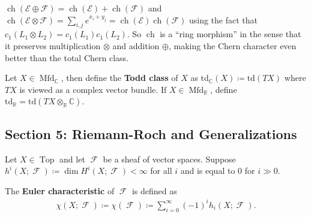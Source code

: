 \begin{remark}

\(\operatorname{ch}(\mathcal{E} \oplus \mathcal{F}) = \operatorname{ch}(\mathcal{E}) + \operatorname{ch}(\mathcal{F})\)
and
\(\operatorname{ch}( \mathcal{E} \otimes\mathcal{F} ) = \sum_{i,j} e^{x_i + y_j} = \operatorname{ch}( \mathcal{E} ) \operatorname{ch}(\mathcal{F} )\)
using the fact that \(c_1(L_1 \otimes L_2) = c_1(L_1) c_1(L_2)\). So
\(\operatorname{ch}\) is a ``ring morphism'' in the sense that it
preserves multiplication \(\otimes\) and addition \(\oplus\), making the
Chern character even better than the total Chern class.

\end{remark}

\begin{definition}

Let \(X \in {\operatorname{Mfd}}_{\mathbb{C}}\), then define the
\textbf{Todd class} of \(X\) as
\(\mathrm{td}_{\mathbb{C}}(X) \coloneqq\mathrm{td}(TX)\) where \(TX\) is
viewed as a complex vector bundle. If
\(X\in {\operatorname{Mfd}}_{\mathbb{R}}\), define
\(\mathrm{td}_{\mathbb{R}}= \mathrm{td}(TX \otimes_{\mathbb{R}}{\mathbb{C}})\).

\end{definition}

\hypertarget{section-5-riemann-roch-and-generalizations}{%
\subsection{Section 5: Riemann-Roch and
Generalizations}\label{section-5-riemann-roch-and-generalizations}}

\begin{remark}

Let \(X\in {\operatorname{Top}}\) and let \(\operatorname{\mathcal{F}}\)
be a sheaf of vector spaces. Suppose
\(h^i(X; \operatorname{\mathcal{F}}) \coloneqq\dim H^i(X; \operatorname{\mathcal{F}}) < \infty\)
for all \(i\) and is equal to 0 for \(i \gg 0\).

\end{remark}

\begin{definition}

The \textbf{Euler characteristic} of \(\operatorname{\mathcal{F}}\) is
defined as
\begin{align*}
\chi(X; \operatorname{\mathcal{F}}) \coloneqq\chi(\operatorname{\mathcal{F}}) \coloneqq\sum_{i=0}^{\infty } (-1)^i h_i(X; \operatorname{\mathcal{F}} )
.\end{align*}

\end{definition}

